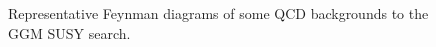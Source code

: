 \documentclass[dissertation.tex]{subfiles}
\begin{document}
\begin{figure}
	\hspace{1cm}
	\caption{Representative Feynman diagrams of some QCD backgrounds to the GGM SUSY search.}
	\label{fig:QCD_background_diagrams}
\end{figure}
\end{document}
